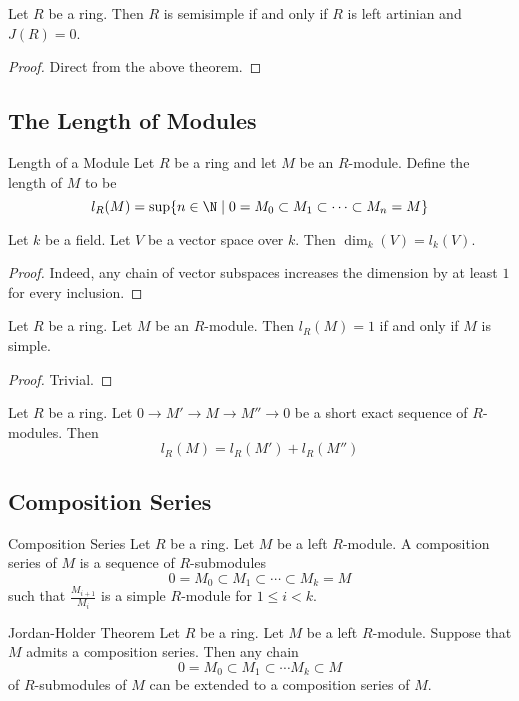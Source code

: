 \documentclass[a4paper]{article}
\begin{document}
\begin{crl}{}{} Let $R$ be a ring. Then $R$ is semisimple if and only if $R$ is left artinian and $J(R)=0$. \tcbline
\begin{proof}
Direct from the above theorem. 
\end{proof}
\end{crl}

\subsection{The Length of Modules}
\begin{defn}{Length of a Module}{} Let $R$ be a ring and let $M$ be an $R$-module. Define the length of $M$ to be $$l_R(M)=\text{sup}\{n\in\N\;|\;0=M_0\subset M_1\subset\cdots\subset M_n=M\}$$
\end{defn}

\begin{eg}{}{} Let $k$ be a field. Let $V$ be a vector space over $k$. Then $\dim_k(V)=l_k(V)$. \tcbline
\begin{proof}
Indeed, any chain of vector subspaces increases the dimension by at least $1$ for every inclusion. 
\end{proof}
\end{eg}

\begin{lmm}{}{} Let $R$ be a ring. Let $M$ be an $R$-module. Then $l_R(M)=1$ if and only if $M$ is simple. \tcbline
\begin{proof}
Trivial. 
\end{proof}
\end{lmm}

\begin{lmm}{}{} Let $R$ be a ring. Let $0\to M'\to M\to M''\to 0$ be a short exact sequence of $R$-modules. Then $$l_R(M)=l_R(M')+l_R(M'')$$
\end{lmm}

\subsection{Composition Series}
\begin{defn}{Composition Series}{} Let $R$ be a ring. Let $M$ be a left $R$-module. A composition series of $M$ is a sequence of $R$-submodules $$0=M_0\subset M_1\subset\cdots\subset M_k=M$$ such that $\frac{M_{i+1}}{M_i}$ is a simple $R$-module for $1\leq i<k$. 
\end{defn}

\begin{thm}{Jordan-Holder Theorem}{} Let $R$ be a ring. Let $M$ be a left $R$-module. Suppose that $M$ admits a composition series. Then any chain $$0=M_0\subset M_1\subset\cdots M_k\subset M$$ of $R$-submodules of $M$ can be extended to a composition series of $M$. 
\end{thm}
\end{document}
